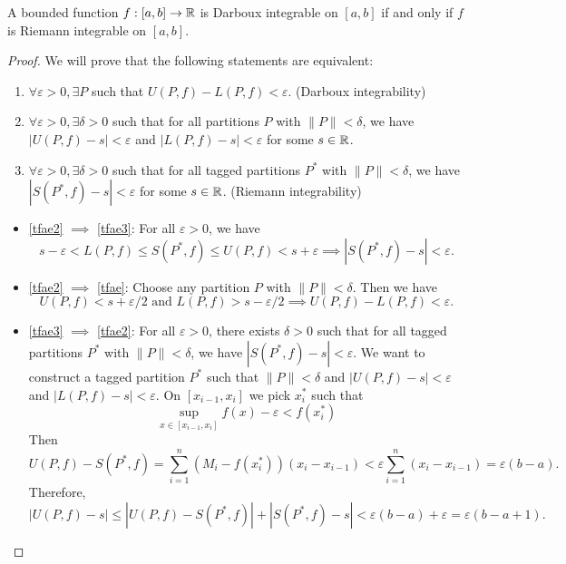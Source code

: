 \begin{theorem}
    A bounded function $f:[a,b]\to\mathbb{R}$ is Darboux integrable on $[a,b]$ if and only if $f$ is Riemann integrable on $[a,b]$.
\end{theorem}
\begin{proof}
    We will prove that the following statements are equivalent:
    \begin{enumerate}
        \item $\forall\varepsilon>0, \exists P$ such that $U(P,f) - L(P,f) < \varepsilon$. (Darboux integrability) \label{tfae}
        \item $\forall\varepsilon>0, \exists \delta>0$ such that for all partitions $P$ with $\|P\|<\delta$, we have $|U(P,f) - s| < \varepsilon$ and $|L(P,f) - s| < \varepsilon$ for some $s\in\mathbb{R}$. \label{tfae2}
        \item $\forall\varepsilon>0, \exists \delta>0$ such that for all tagged partitions $P^*$ with $\|P\|<\delta$, we have $|S(P^*,f) - s| < \varepsilon$ for some $s\in\mathbb{R}$. (Riemann integrability) \label{tfae3}
    \end{enumerate}
    \begin{itemize}
        \item \ref{tfae2} $\implies$ \ref{tfae3}: For all $\varepsilon>0$, we have
        \[
            s - \varepsilon < L(P,f) \le S(P^*,f) \le U(P,f) < s + \varepsilon \implies |S(P^*,f) - s| < \varepsilon.
        \] 
        \item \ref{tfae2} $\implies$ \ref{tfae}: Choose any partition $P$ with $\|P\|<\delta$. Then we have
        \[
            U(P,f) < s + \varepsilon/2 \text{ and } L(P,f) > s - \varepsilon/2 \implies U(P,f) - L(P,f) < \varepsilon.
        \]
        \item \ref{tfae3} $\implies$ \ref{tfae2}: For all $\varepsilon>0$, there exists $\delta>0$ such that for all tagged partitions $P^*$ with $\|P\|<\delta$, we have $|S(P^*,f) - s| < \varepsilon$. We want to construct a tagged partition $P^*$ such that $\|P\|<\delta$ and $|U(P,f) - s| < \varepsilon$ and $|L(P,f) - s| < \varepsilon$. On $[x_{i-1},x_i]$ we pick $x_i^*$ such that 
        \[
            \sup_{x\in[x_{i-1},x_i]} f(x) - \varepsilon < f(x_i^*)
        \]
        Then
        \[
            U(P,f) - S(P^*,f) = \sum_{i=1}^n (M_i - f(x_i^*))(x_i - x_{i-1}) < \varepsilon \sum_{i=1}^n (x_i - x_{i-1}) = \varepsilon(b-a).
        \]
        Therefore,
        \[
            |U(P,f) - s| \le |U(P,f) - S(P^*,f)| + |S(P^*,f) - s| < \varepsilon(b-a) + \varepsilon = \varepsilon(b-a+1).
\]
\end{itemize}
\end{proof}

